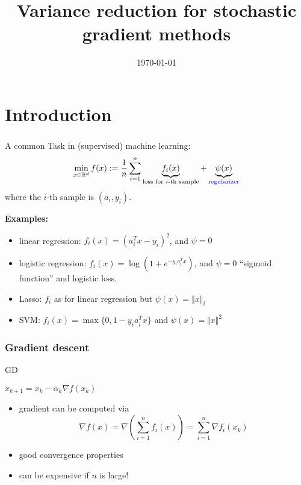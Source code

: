 \documentclass{beamer}
\title{Variance reduction for stochastic gradient methods}
\date{\today}
\begin{document}
\maketitle
\frame{\tableofcontents[currentsection]}

\section{Introduction}%


\begin{frame}
  \frametitle{}
  A common Task in (supervised) machine learning:
  \begin{equation}
    \min_{x\in \mathbb{R}^d} f(x) := \frac{1}{n} \sum_{i=1}^{n} \underbrace{f_i(x)}_{\text{loss for $i$-th sample}} + \underbrace{\psi(x)}_{\textcolor{blue}{\text{regularizer}}}
  \end{equation}
  where the $i$-th sample is $(a_i, y_i)$.

  \textbf{Examples:}
  \begin{itemize}
    \item linear regression: $f_i(x) = {(a_i^T x -y_i)}^2$, and $\psi=0$
    \item logistic regression: $f_i(x) = \log(1+e^{-y_i a_i^T x})$, and $\psi=0$
          ``sigmoid function'' and logistic loss.
    \item Lasso: $f_i$ as for linear regression but $\psi(x) = \Vert x \Vert_i$
    \item SVM: $f_i(x) = \max \{0 , 1 - y_i a_i^T x\}$ and $\psi(x)= \Vert x \Vert^2$
  \end{itemize}
\end{frame}

\begin{frame}
  \frametitle{Gradient descent}
  \begin{algorithm}[H]
    \caption{GD}
    \begin{algorithmic}[1]
      \State $x_{k+1} = x_k  - \alpha_k \nabla f(x_k) $
      \Endfor
    \end{algorithmic}
  \end{algorithm}

  \begin{itemize}
    \item gradient can be computed via
          \begin{equation}
            \nabla f(x) = \nabla \left(\sum_{i=1}^{n}f_i(x)\right) = \sum_{i=1}^{n} \nabla f_i(x_k)
          \end{equation}
    \item good convergence properties
    \item can be expensive if $n$ is large!
  \end{itemize}


\end{frame}
\end{document}
